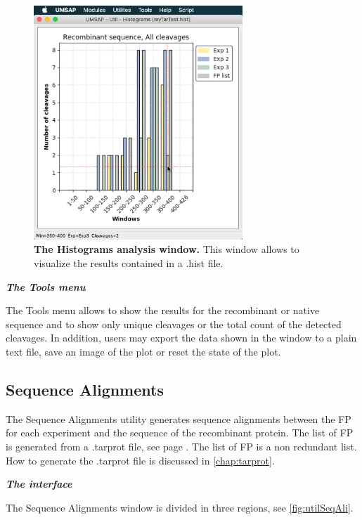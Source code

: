 \begin{figure}[h]
	\centering
	\includegraphics[width=0.7\textwidth]{./IMAGES/UTIL-HIST-WINDOW/util-histo-res.jpg}	    
	\caption[The Histograms analysis window]{\textbf{The Histograms analysis window.} This window allows to visualize the results contained in a .hist file.} 
	\label{fig:utilHistoCutShow}
	\vspace{-5pt} 	
\end{figure}

\textit{\textbf{The Tools menu}}

The Tools menu allows to show the results for the recombinant or native sequence and to show only unique cleavages or the total count of the detected cleavages. In addition, users may export the data shown in the window to a plain text file, save an image of the plot or reset the state of the plot.

\subsection{Sequence Alignments}
\label{subsec:utilSeqAli}
The Sequence Alignments utility generates sequence alignments between the FP for each experiment and the sequence of the recombinant protein. The list of FP is generated from a .tarprot file, see page \pageref{par:tarprotPIP}. The list of FP is a non redundant list. How to generate the .tarprot file is discussed in \autoref{chap:tarprot}.

\textit{\textbf{The interface}}

The Sequence Alignments window is divided in three regions, see \autoref{fig:utilSeqAli}.

